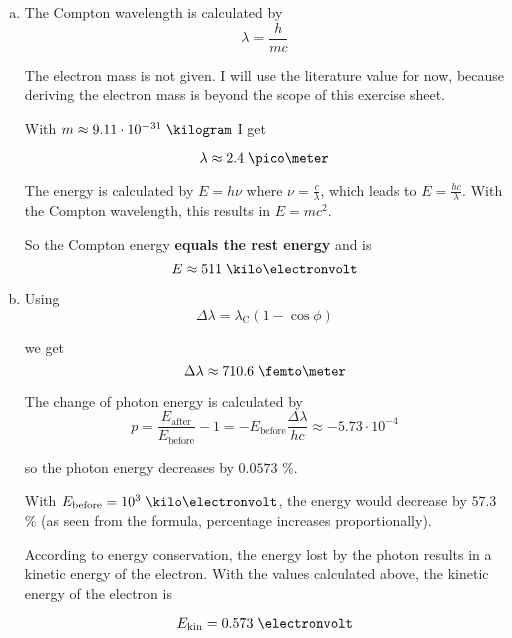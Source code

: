 \documentclass[a4paper,german,12pt,smallheadings]{scrartcl}
\begin{document}
\begin{enumerate}[a)]
  \item
    The Compton wavelength is calculated by
    \begin{equation*}
      \lambda = \frac{h}{mc}
    \end{equation*}

    The electron mass is not given. I will use the literature value for now,
    because deriving the electron mass is beyond the scope of this exercise
    sheet.

    With $m \approx 9.11 \cdot 10^{-31} \; \kilogram$ I get

    \begin{equation*}
      \lambda \approx 2.4 \; \pico\meter
    \end{equation*}

    The energy is calculated by $E = h \nu$ where $\nu = \frac{c}{\lambda}$,
    which leads to $E = \frac{hc}{\lambda}$. With the Compton wavelength, this
    results in $E=mc^2$.

    So the Compton energy \textbf{equals the rest energy} and is
    \begin{equation*}
      E \approx 511 \; \kilo\electronvolt
    \end{equation*}

  \item
    Using
    \begin{equation*}
      \Delta \lambda = \lambda_{\text{C}} \left( 1 - \cos \phi \right)
    \end{equation*}

    we get
    \begin{equation*}
      \Delta \lambda \approx 710.6 \; \femto\meter
    \end{equation*}

    The change of photon energy is calculated by
    \begin{equation*}
      p = \frac{E_\text{after}}{E_\text{before}} - 1 = - E_{\text{before}} \frac{\Delta\lambda}{hc} \approx - 5.73 \cdot 10^{-4}
    \end{equation*}

    so the photon energy decreases by $0.0573$ \%.

    With $E_{\text{before}} = 10^3 \; \kilo\electronvolt$, the energy would
    decrease by $57.3$ \% (as seen from the formula, percentage increases
    proportionally).

    According to energy conservation, the energy lost by the photon results in
    a kinetic energy of the electron. With the values calculated above, the
    kinetic energy of the electron is

    \begin{equation*}
      E_\text{kin} = 0.573 \; \electronvolt
    \end{equation*}
\end{enumerate}
\end{document}
